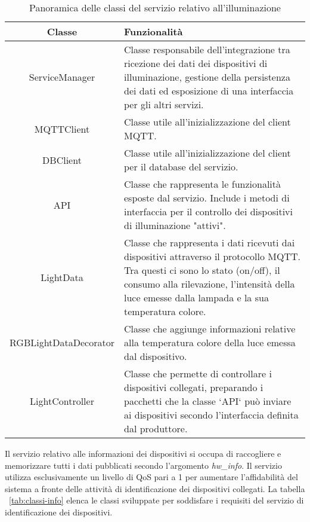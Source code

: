 \begin{table}[!h]
\caption{Panoramica delle classi del servizio relativo all'illuminazione}
\label{tab:classi-illuminazione}
\begin{tabularx}{\linewidth}{|c|X|}
\hline
\textbf{Classe} & \textbf{Funzionalità} \\
\hline
ServiceManager & Classe responsabile dell'integrazione tra ricezione dei dati dei dispositivi di illuminazione, gestione della persistenza dei dati ed esposizione di una interfaccia per gli altri servizi. \\
\hline
MQTTClient & Classe utile all'inizializzazione del client MQTT. \\
\hline
DBClient & Classe utile all'inizializzazione del client per il database del servizio. \\
\hline
API & Classe che rappresenta le funzionalità esposte dal servizio. Include i metodi di interfaccia per il controllo dei dispositivi di illuminazione "attivi". \\
\hline
LightData & Classe che rappresenta i dati ricevuti dai dispositivi attraverso il protocollo MQTT. Tra questi ci sono lo stato (on/off), il consumo alla rilevazione, l'intensità della luce emesse dalla lampada e la sua temperatura colore. \\
\hline
RGBLightDataDecorator & Classe che aggiunge informazioni relative alla temperatura colore della luce emessa dal dispositivo. \\
\hline
LightController & Classe che permette di controllare i dispositivi collegati, preparando i pacchetti che la classe `API` può inviare ai dispositivi secondo l'interfaccia definita dal produttore. \\
\hline
\end{tabularx}
\end{table}

Il servizio relativo alle informazioni dei dispositivi si occupa di raccogliere e memorizzare tutti i dati pubblicati secondo l'argomento \emph{hw\_info}.
Il servizio utilizza esclusivamente un livello di QoS pari a 1 per aumentare l'affidabilità del sistema a fronte delle attività di identificazione dei dispositivi collegati.
La tabella ~\ref{tab:classi-info} elenca le classi sviluppate per soddisfare i requisiti del servizio di identificazione dei dispositivi.

